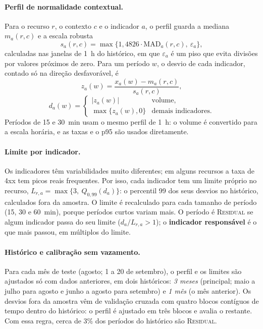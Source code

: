 \documentclass[sigconf,nonacm]{acmart}
\newcommand{\Residual}{\textsc{Residual}\xspace}
\begin{document}
\paragraph{Perfil de normalidade contextual.} Para o recurso $r$, o contexto $c$ e o indicador $a$, o perfil guarda a mediana $m_a(r,c)$ e a escala robusta~\citep{leys2013mad}
\begin{equation}
  s_a(r,c)=\max\{1{,}4826\cdot\mathrm{MAD}_a(r,c),\ \varepsilon_a\},
\end{equation}
calculadas nas janelas de 1~h do histórico, em que $\varepsilon_a$ é um piso que evita divisões por valores próximos de zero. Para um período $w$, o desvio de cada indicador, contado só na direção desfavorável, é
\begin{equation}
  z_a(w)=\frac{x_a(w)-m_a(r,c)}{s_a(r,c)},
\end{equation}
\begin{equation}
  d_a(w)=\begin{cases}|z_a(w)| & \text{volume,}\\ \max\{z_a(w),0\} & \text{demais indicadores.}\end{cases}
\end{equation}
Períodos de 15 e 30~min usam o mesmo perfil de 1~h: o volume é convertido para a escala horária, e as taxas e o p95 são usados diretamente.

\paragraph{Limite por indicador.} Os indicadores têm variabilidades muito diferentes; em alguns recursos a taxa de 4xx tem picos reais frequentes. Por isso, cada indicador tem um limite próprio no recurso, $L_{r,a}=\max\{3,\ Q_{0{,}99}(d_a)\}$: o percentil 99 dos seus desvios no histórico, calculados fora da amostra. O limite é recalculado para cada tamanho de período (15, 30 e 60~min), porque períodos curtos variam mais. O período é \Residual se algum indicador passa do seu limite ($d_a/L_{r,a}>1$); o \textbf{indicador responsável} é o que mais passou, em múltiplos do limite.

\paragraph{Histórico e calibração sem vazamento.} Para cada mês de teste (agosto; 1 a 20 de setembro), o perfil e os limites são ajustados só com dados anteriores, em dois históricos: \emph{3 meses} (principal; maio a julho para agosto e junho a agosto para setembro) e \emph{1 mês} (o mês anterior). Os desvios fora da amostra vêm de validação cruzada com quatro blocos contíguos de tempo dentro do histórico: o perfil é ajustado em três blocos e avalia o restante. Com essa regra, cerca de 3\% dos períodos do histórico são \Residual.
\end{document}
